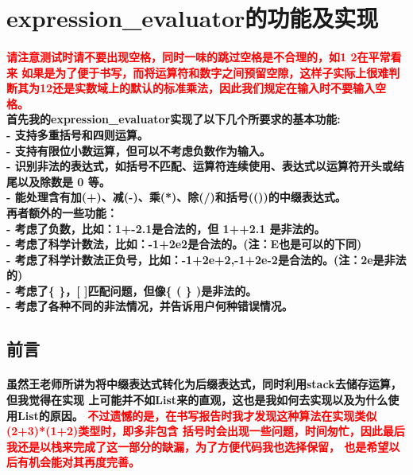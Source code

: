 \documentclass[UTF8]{ctexart}
\begin{document}
\pagestyle{fancy}
\fancyhead{}
\setlength{\headheight}{12.64723pt}

\section{expression\_evaluator的功能及实现}

\paragraph{
    \textcolor{red}{请注意测试时请不要出现空格，同时一味的跳过空格是不合理的，如1 2在平常看来
如果是为了便于书写，而将运算符和数字之间预留空隙，这样子实际上很难判断其为12还是实数域上的默认的标准乘法，因此我们规定在输入时不要输入空格。}\\
首先我的expression\_evaluator实现了以下几个所要求的基本功能: \\
- 支持多重括号和四则运算。\\
- 支持有限位小数运算，但可以不考虑负数作为输入。\\
- 识别非法的表达式，如括号不匹配、运算符连续使用、表达式以运算符开头或结尾以及除数是 0 等。\\
- 能处理含有加(+)、减(-)、乘(*)、除(/)和括号(())的中缀表达式。\\
再者额外的一些功能：\\
- 考虑了负数，比如：1+-2.1是合法的，但 1++2.1 是非法的。\\
- 考虑了科学计数法，比如：-1+2e2是合法的。(注：E也是可以的下同)\\
- 考虑了科学计数法正负号，比如：-1+2e+2,-1+2e-2是合法的。(注：2e是非法的)\\
- 考虑了\{ \}，[ ]匹配问题，但像\{ ( \} )是非法的。\\
- 考虑了各种不同的非法情况，并告诉用户何种错误情况。\\
}
\subsection{前言}
\paragraph{\hspace{2em}
虽然王老师所讲为将中缀表达式转化为后缀表达式，同时利用stack去储存运算，但我觉得在实现
上可能并不如List来的直观，这也是我如何去实现以及为什么使用List的原因。
\textcolor{red}{不过遗憾的是，在书写报告时我才发现这种算法在实现类似(2+3)*(1+2)类型时，即多非包含
括号时会出现一些问题，时间匆忙，因此最后我还是以栈来完成了这一部分的缺漏，为了方便代码我也选择保留，
也是希望以后有机会能对其再度完善。}
}
\end{document}
